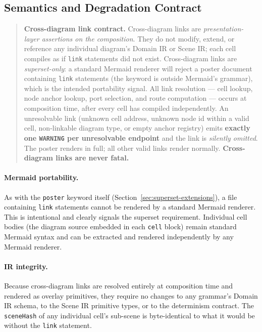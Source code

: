 \subsection{Semantics and Degradation Contract}
\label{sec:cdl-semantics}

\begin{quote}
\textbf{Cross-diagram link contract.}
Cross-diagram links are \emph{presentation-layer assertions on the
composition}.  They do not modify, extend, or reference any individual
diagram's Domain IR or Scene IR; each cell compiles as if \texttt{link}
statements did not exist.  Cross-diagram links are \emph{superset-only}: a
standard Mermaid renderer will reject a poster document containing
\texttt{link} statements (the keyword is outside Mermaid's grammar), which is
the intended portability signal.  All link resolution --- cell lookup, node
anchor lookup, port selection, and route computation --- occurs at composition
time, after every cell has compiled independently.  An unresolvable link
(unknown cell address, unknown node id within a valid cell, non-linkable
diagram type, or empty anchor registry) emits \textbf{exactly one
\texttt{WARNING} per unresolvable endpoint} and the link is \emph{silently
omitted}.  The poster renders in full; all other valid links render normally.
\textbf{Cross-diagram links are never fatal.}
\end{quote}

\paragraph{Mermaid portability.}

As with the \texttt{poster} keyword itself (Section~\ref{sec:superset-extensions}),
a file containing \texttt{link} statements cannot be rendered by a standard
Mermaid renderer.  This is intentional and clearly signals the superset
requirement.  Individual cell bodies (the diagram source embedded in each
\texttt{cell} block) remain standard Mermaid syntax and can be extracted and
rendered independently by any Mermaid renderer.

\paragraph{IR integrity.}

Because cross-diagram links are resolved entirely at composition time and
rendered as overlay primitives, they require no changes to any grammar's
Domain IR schema, to the Scene IR primitive types, or to the determinism
contract.  The \texttt{sceneHash} of any individual cell's sub-scene is
byte-identical to what it would be without the \texttt{link} statement.

